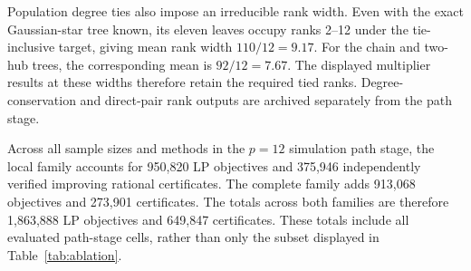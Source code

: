 Population degree ties also impose an irreducible rank width. Even with the exact Gaussian-star tree known, its eleven leaves occupy ranks 2--12 under the tie-inclusive target, giving mean rank width $110/12=9.17$. For the chain and two-hub trees, the corresponding mean is $92/12=7.67$. The displayed multiplier results at these widths therefore retain the required tied ranks. Degree-conservation and direct-pair rank outputs are archived separately from the path stage.

Across all sample sizes and methods in the $p=12$ simulation path stage{,} the local family accounts for 950{,}820 LP objectives and 375{,}946 independently verified improving rational certificates. The complete family adds 913{,}068 objectives and 273{,}901 certificates. The totals across both families are therefore 1{,}863{,}888 LP objectives and 649{,}847 certificates. These totals include all evaluated path-stage cells{,} rather than only the subset displayed in Table~\ref{tab:ablation}.
